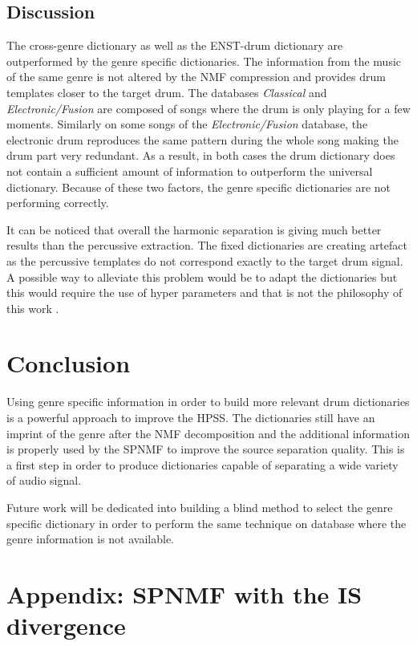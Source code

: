 \documentclass{article}
\begin{document}
\subsection{Discussion}

The cross-genre dictionary as well as the ENST-drum dictionary are outperformed by the genre specific dictionaries. The information from the music of the same genre is not altered by the NMF compression and provides drum templates closer to the target drum.  
The databases \emph{Classical} and \emph{Electronic/Fusion} are composed of songs where the drum is only playing for a few moments. Similarly on some songs of the \emph{Electronic/Fusion} database, the electronic drum reproduces the same pattern during the whole song making the drum part very redundant. As a result, in both cases the drum dictionary does not contain a sufficient amount of information to outperform the universal dictionary. Because of these two factors, the genre specific dictionaries are not performing correctly.

It can be noticed that overall the harmonic separation is giving much better results than the percussive extraction. The fixed dictionaries are creating artefact as the percussive templates do not correspond exactly to the target drum signal. A possible way to alleviate this problem would be to adapt the dictionaries but this would require the use of hyper parameters and that is not the philosophy of this work \cite{laroche2015structured}.



\section{Conclusion}\label{sec:conclusion}

Using genre specific information in order to build more relevant drum dictionaries is a powerful approach to improve the HPSS. The dictionaries still have an imprint of the genre after the NMF decomposition and the additional information is properly used by the SPNMF to improve the source separation quality. This is a first step in order to produce dictionaries capable of separating a wide variety of audio signal. 

Future work will be dedicated into building a blind method to select the genre specific dictionary in order to perform the same technique on database where the genre information is not available. 


\section{Appendix: SPNMF with the IS divergence}\label{ISdisteq}
 
\end{document}
